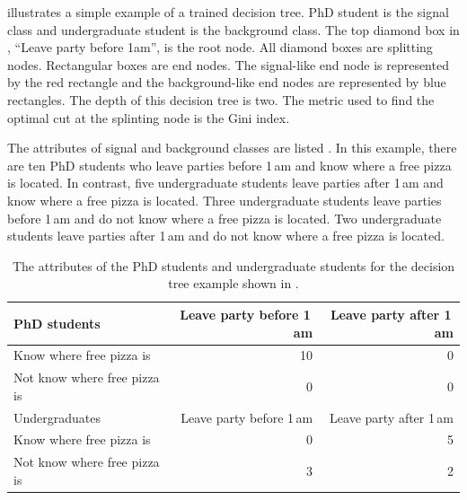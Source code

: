  illustrates a simple example of a trained decision tree. PhD student is the signal class and undergraduate student is the background class. The top diamond box in ,   ``Leave party  before  1am'', is the root node. All diamond boxes are splitting nodes. Rectangular boxes are end nodes.  The signal-like end node is represented by the red rectangle and the background-like end nodes are represented by blue rectangles. The depth of this decision tree is two. The metric used to find the optimal cut at the splinting node is the Gini index.


The attributes of signal and background classes are listed . In this example, there are ten PhD students who leave parties before 1\,am and know where a free pizza is located. In contrast, five undergraduate students leave parties after 1\,am and know where a free pizza is located. Three undergraduate students leave parties before 1\,am and do not know where a free pizza is located. Two undergraduate students leave parties after 1\,am and do not know where a free pizza is located.


\begin{table}[!htbp]\centering

\begin{tabular}{lrr}
\hline \hline
PhD students & Leave party before 1\,am  & Leave party after 1\,am\\
\hline
Know where free pizza is & 10 & 0 \\
Not know where free pizza is & 0 & 0 \\
\hline
Undergraduates & Leave party before 1\,am  & Leave party after 1\,am\\
\hline
Know where free pizza is & 0 & 5 \\
Not know where free pizza is & 3 & 2 \\
\hline \hline
\end{tabular}
\caption
{The attributes of  the PhD students and undergraduate students for the decision tree example shown in .}
\label{tab:doubleHiggsDecisionTreeComic2}
\end{table}

